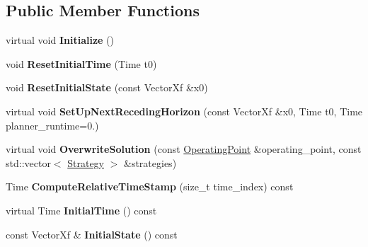 \subsection*{Public Member Functions}
\begin{DoxyCompactItemize}
\item 
virtual void {\bfseries Initialize} ()\hypertarget{classilqgames_1_1_problem_ab94512f9e9896104bceada1c444a1ad9}{}\label{classilqgames_1_1_problem_ab94512f9e9896104bceada1c444a1ad9}

\item 
void {\bfseries Reset\+Initial\+Time} (Time t0)\hypertarget{classilqgames_1_1_problem_a559eb8753ba5b82afeb6c69dd722a306}{}\label{classilqgames_1_1_problem_a559eb8753ba5b82afeb6c69dd722a306}

\item 
void {\bfseries Reset\+Initial\+State} (const Vector\+Xf \&x0)\hypertarget{classilqgames_1_1_problem_ac59f8a49b028baa3d72cb065d35b8193}{}\label{classilqgames_1_1_problem_ac59f8a49b028baa3d72cb065d35b8193}

\item 
virtual void {\bfseries Set\+Up\+Next\+Receding\+Horizon} (const Vector\+Xf \&x0, Time t0, Time planner\+\_\+runtime=0.)\hypertarget{classilqgames_1_1_problem_adada206413bc775f078653da9c2ed033}{}\label{classilqgames_1_1_problem_adada206413bc775f078653da9c2ed033}

\item 
virtual void {\bfseries Overwrite\+Solution} (const \hyperlink{structilqgames_1_1_operating_point}{Operating\+Point} \&operating\+\_\+point, const std\+::vector$<$ \hyperlink{structilqgames_1_1_strategy}{Strategy} $>$ \&strategies)\hypertarget{classilqgames_1_1_problem_a14744049661872191758323a4947f072}{}\label{classilqgames_1_1_problem_a14744049661872191758323a4947f072}

\item 
Time {\bfseries Compute\+Relative\+Time\+Stamp} (size\+\_\+t time\+\_\+index) const \hypertarget{classilqgames_1_1_problem_a424e7aaa780d06a7ab18ea19fb0cda40}{}\label{classilqgames_1_1_problem_a424e7aaa780d06a7ab18ea19fb0cda40}

\item 
virtual Time {\bfseries Initial\+Time} () const \hypertarget{classilqgames_1_1_problem_ab0eeee481eeb53317658fb9a38648f30}{}\label{classilqgames_1_1_problem_ab0eeee481eeb53317658fb9a38648f30}

\item 
const Vector\+Xf \& {\bfseries Initial\+State} () const \hypertarget{classilqgames_1_1_problem_a9b4d86b6f76908fdfc5ac82aae9320cb}{}\label{classilqgames_1_1_problem_a9b4d86b6f76908fdfc5ac82aae9320cb}


\end{DoxyCompactItemize}
